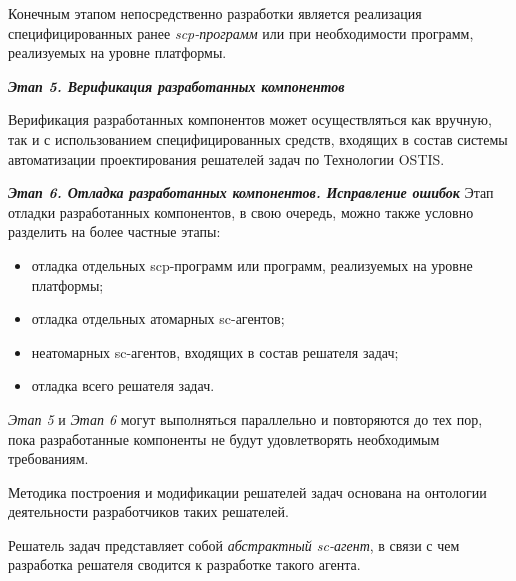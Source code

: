 Конечным этапом непосредственно разработки является реализация специфицированных ранее \textit{scp-программ} или при необходимости программ, реализуемых на уровне платформы.

\textbf{\textit{Этап 5. Верификация разработанных компонентов}}

Верификация разработанных компонентов может осуществляться как вручную, так и с использованием специфицированных средств, входящих в состав системы автоматизации проектирования решателей задач по Технологии OSTIS.

\textbf{\textit{Этап 6. Отладка разработанных компонентов. Исправление ошибок}}
Этап отладки разработанных компонентов, в свою очередь, можно также условно разделить на более частные этапы:

\begin{itemize}
    \item отладка отдельных scp-программ или программ, реализуемых на уровне платформы;
    \item отладка отдельных атомарных sc-агентов;
    \item неатомарных sc-агентов, входящих в состав решателя задач;
    \item отладка всего решателя задач.
\end{itemize}

\textit{Этап 5} и \textit{Этап 6} могут выполняться параллельно и повторяются до тех пор, пока разработанные компоненты не будут удовлетворять необходимым требованиям.

Методика построения и модификации решателей задач основана на онтологии деятельности разработчиков таких решателей.

Решатель задач представляет собой \textit{абстрактный sc-агент}, в связи с чем разработка решателя сводится к разработке такого агента.

